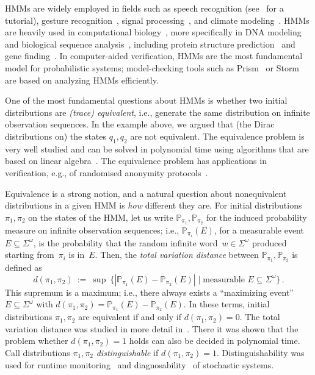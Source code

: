\documentclass[a4paper,UKenglish,cleveref, autoref,mathscr]{lipics-v2019}
\newcommand{\PP}{\mathbb{P}}
\newcommand{\1}{\mathbbm{1}}
\begin{document}
HMMs are widely employed in fields such as speech recognition (see~\cite{Rabiner89} for a tutorial),
gesture recognition~\cite{Gesture},
signal processing~\cite{SignalProcessing},
and climate modeling~\cite{Weather}.
HMMs are heavily used in computational biology~\cite{HMM-comp-biology},
more specifically in DNA modeling~\cite{DNA-modeling} and biological sequence analysis~\cite{durbin1998biological},
including protein structure prediction~\cite{ProteinStructure} %
and gene finding~\cite{GeneFinding}.
In computer-aided verification, HMMs are the most fundamental model for probabilistic systems; model-checking tools such as Prism~\cite{KNP11} or Storm~\cite{Storm} are based on analyzing HMMs efficiently.

One of the most fundamental questions about HMMs is whether two initial distributions are \emph{(trace) equivalent}, i.e., generate the same distribution on infinite observation sequences.
In the example above, we argued that (the Dirac distributions on) the states $q_1, q_2$ are not equivalent.
The equivalence problem is very well studied and can be solved in polynomial time using algorithms that are based on linear algebra~\cite{schut61,Paz71,Tzeng92,CortesMRdistance}.
The equivalence problem has applications in verification, e.g., of randomised anonymity protocols~\cite{kief11}.

Equivalence is a strong notion, and a natural question about nonequivalent distributions in a given HMM is \emph{how} different they are.
For initial distributions $\pi_1, \pi_2$ on the states of the HMM, let us write $\PP_{\pi_1}, \PP_{\pi_2}$ for the induced probability measure on infinite observation sequences; i.e., $\PP_{\pi_i}(E)$, for a measurable event $E \subseteq \Sigma^\omega$, is the probability that the random infinite word~$w \in \Sigma^\omega$ produced starting from~$\pi_i$ is in~$E$.
Then, the \emph{total variation distance} between $\PP_{\pi_1}, \PP_{\pi_2}$ is defined as
\[
 d(\pi_1,\pi_2) \ := \ \sup~\{ |\PP_{\pi_1}(E) - \PP_{\pi_2}(E)| \mid \text{measurable } E \subseteq \Sigma^\omega\}\,.
\]
This supremum is a maximum; i.e., there always exists a ``maximizing event'' $E \subseteq \Sigma^\omega$ with $d(\pi_1,\pi_2) = \PP_{\pi_1}(E) - \PP_{\pi_2}(E)$.
In these terms, initial distributions $\pi_1, \pi_2$ are equivalent if and only if $d(\pi_1, \pi_2) = 0$.
The total variation distance was studied in more detail in~\cite{kief14}.
There it was shown that the problem whether $d(\pi_1, \pi_2) = 1$ holds can also be decided in polynomial time.
Call distributions $\pi_1, \pi_2$ \emph{distinguishable} if $d(\pi_1, \pi_2) = 1$.
Distinguishability was used for runtime monitoring~\cite{kief16} and diagnosability~\cite{BertrandHL16,AkshayBFG19} of stochastic systems.
\end{document}
